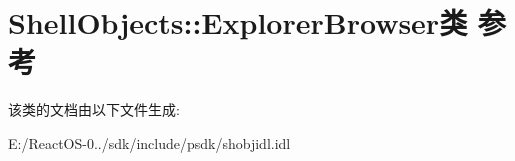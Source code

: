 \hypertarget{class_shell_objects_1_1_explorer_browser}{}\section{Shell\+Objects\+:\+:Explorer\+Browser类 参考}
\label{class_shell_objects_1_1_explorer_browser}


该类的文档由以下文件生成\+:\begin{DoxyCompactItemize}
\item 
E\+:/\+React\+O\+S-\/0../sdk/include/psdk/shobjidl.\+idl\end{DoxyCompactItemize}
